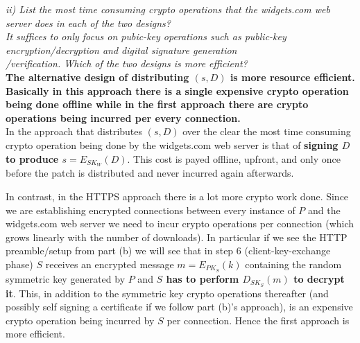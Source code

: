 \textit{ii) List the most time consuming crypto operations that the widgets.com web server does in each of the two designs?\\\indent It suffices to only focus on pubic-key operations such as public-key encryption/decryption and digital signature generation\\\indent/verification. Which of the two designs is more efficient?}\\

\noindent \textbf{The alternative design of distributing $(s, D)$ is more resource efficient. Basically in this approach there is a single expensive crypto operation being done offline while in the first approach there are crypto operations being incurred per every connection.}\\ 

In the approach that distributes $(s, D)$ over the clear the most time consuming crypto operation being done by the widgets.com web server is that of \textbf{signing $D$ to produce $s = E_{SK_W}(D)$}. This cost is payed offline, upfront, and only once before the patch is distributed and never incurred again afterwards. 

In contrast, in the HTTPS approach there is a lot more crypto work done. Since we are establishing encrypted connections between every instance of $P$ and the widgets.com web server we need to incur crypto operations per connection (which grows linearly with the number of downloads). In particular if we see the HTTP preamble/setup from part (b) we will see that in step 6 (client-key-exchange phase) $S$ receives an encrypted message $m = E_{PK_S}(k)$ containing the random symmetric key generated by $P$ and \textbf{$S$ has to perform $D_{SK_S}(m)$ to decrypt it}. This, in addition to the symmetric key crypto operations thereafter (and possibly self signing a certificate if we follow part (b)'s approach), is an expensive crypto operation being incurred by $S$ per connection. Hence the first approach is more efficient.

